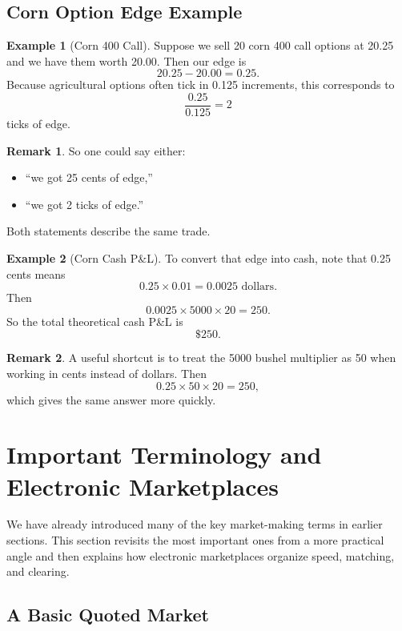 \documentclass[11pt]{article}
\theoremstyle{definition}
\newtheorem{example}{Example}[section]
\newtheorem{remark}{Remark}[section]
\begin{document}
\subsection{Corn Option Edge Example}

\begin{example}[Corn 400 Call]
Suppose we sell 20 corn 400 call options at 20.25 and we have them worth 20.00. Then our edge is
\[
20.25 - 20.00 = 0.25.
\]
Because agricultural options often tick in 0.125 increments, this corresponds to
\[
\frac{0.25}{0.125} = 2
\]
ticks of edge.
\end{example}

\begin{remark}
So one could say either:
\begin{itemize}[leftmargin=2em]
    \item ``we got 25 cents of edge,''
    \item ``we got 2 ticks of edge.''
\end{itemize}
Both statements describe the same trade.
\end{remark}

\begin{example}[Corn Cash P\&L]
To convert that edge into cash, note that 0.25 cents means
\[
0.25 \times 0.01 = 0.0025 \text{ dollars}.
\]
Then
\[
0.0025 \times 5000 \times 20 = 250.
\]
So the total theoretical cash P\&L is
\[
\boxed{\$250.}
\]
\end{example}

\begin{remark}
A useful shortcut is to treat the 5000 bushel multiplier as 50 when working in cents instead of dollars. Then
\[
0.25 \times 50 \times 20 = 250,
\]
which gives the same answer more quickly.
\end{remark}

\section{Important Terminology and Electronic Marketplaces}

We have already introduced many of the key market-making terms in earlier sections. This section revisits the most important ones from a more practical angle and then explains how electronic marketplaces organize speed, matching, and clearing.

\subsection{A Basic Quoted Market}
\end{document}
